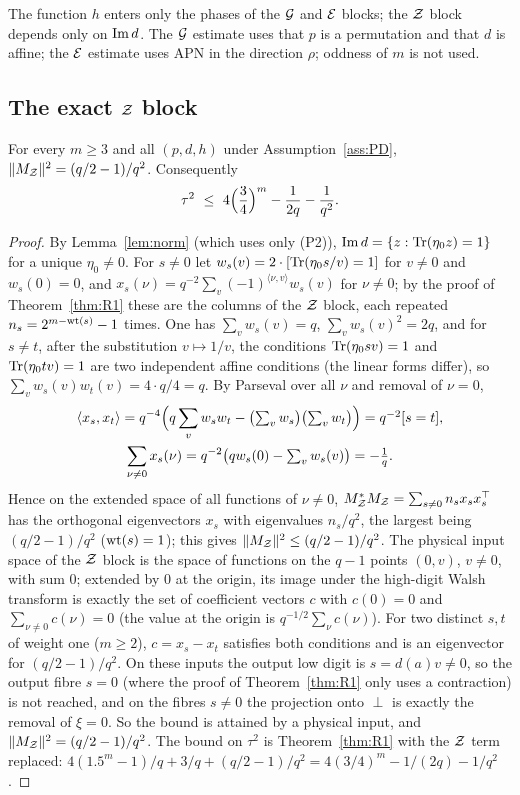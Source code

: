 The function $h$ enters only the phases of the $\mathcal{G}$ and $\mathcal{E}$ blocks; the $\mathcal{Z}$ block depends only on $\mathrm{Im}\, d$.
The $\mathcal{G}$ estimate uses that $p$ is a permutation and that $d$ is affine; the $\mathcal{E}$ estimate uses APN in the direction
$\rho$; oddness of $m$ is not used.


\subsection{The exact $\mathcal{Z}$ block}
\begin{proposition}\label{prop:Zexact}
For every $m\ge3$ and all $(p,d,h)$ under Assumption~\ref{ass:PD}, $\|M_{\mathcal{Z}}\|^2=(q/2-1)/q^2$. Consequently
\[
\tau^2\ \le\ 4\Bigl(\frac34\Bigr)^m-\frac1{2q}-\frac1{q^2}.
\]
\end{proposition}
\begin{proof}
By Lemma~\ref{lem:norm} (which uses only (P2)), $\mathrm{Im}\, d=\{z:\mathrm{Tr}(\eta_0z)=1\}$ for a unique $\eta_0\ne0$. For $s\ne0$ let
$w_s(v)=2\cdot[\mathrm{Tr}(\eta_0s/v)=1]$ for $v\ne0$ and $w_s(0)=0$, and $x_s(\nu)=q^{-2}\sum_v(-1)^{\langle\nu,v\rangle}w_s(v)$ for $\nu\ne0$; by
the proof of Theorem~\ref{thm:R1} these are the columns of the $\mathcal{Z}$ block, each repeated $n_s=2^{m-\mathrm{wt}(s)}-1$ times.
One has $\sum_vw_s(v)=q$, $\sum_vw_s(v)^2=2q$, and for $s\ne t$, after the substitution $v\mapsto1/v$, the conditions
$\mathrm{Tr}(\eta_0sv)=1$ and $\mathrm{Tr}(\eta_0tv)=1$ are two independent affine conditions (the linear forms differ), so
$\sum_vw_s(v)w_t(v)=4\cdot q/4=q$. By Parseval over all $\nu$ and removal of $\nu=0$,
\begin{gather*}
\langle x_s,x_t\rangle=q^{-4}\Bigl(q\sum_vw_sw_t-\bigl(\textstyle\sum_vw_s\bigr)\bigl(\sum_vw_t\bigr)\Bigr)=q^{-2}[s=t],\\
\sum_{\nu\ne0}x_s(\nu)=q^{-2}\bigl(qw_s(0)-\textstyle\sum_vw_s(v)\bigr)=-\frac1q .
\end{gather*}
Hence on the extended space of all functions of $\nu\ne0$, $M_{\mathcal{Z}}^*M_{\mathcal{Z}}=\sum_{s\ne0}n_sx_sx_s^{\top}$ has the orthogonal
eigenvectors $x_s$ with eigenvalues $n_s/q^2$, the largest being $(q/2-1)/q^2$ ($\mathrm{wt}(s)=1$); this gives
$\|M_{\mathcal{Z}}\|^2\le(q/2-1)/q^2$. The physical input space of the $\mathcal{Z}$ block is the space of functions on the $q-1$ points $(0,v)$,
$v\ne0$, with sum $0$; extended by $0$ at the origin, its image under the high-digit Walsh transform is exactly the set of
coefficient vectors $c$ with $c(0)=0$ and $\sum_{\nu\ne0}c(\nu)=0$ (the value at the origin is $q^{-1/2}\sum_\nu c(\nu)$). For two
distinct $s,t$ of weight one ($m\ge2$), $c=x_s-x_t$ satisfies both conditions and is an eigenvector for $(q/2-1)/q^2$. On these
inputs the output low digit is $s=d(a)v\ne0$, so the output fibre $s=0$ (where the proof of Theorem~\ref{thm:R1} only uses a contraction) is not
reached, and on the fibres $s\ne0$ the projection onto $\perp$ is exactly the removal of $\xi=0$. So the bound is attained by
a physical input, and $\|M_{\mathcal{Z}}\|^2=(q/2-1)/q^2$. The bound on $\tau^2$ is Theorem~\ref{thm:R1} with the $\mathcal{Z}$ term replaced:
$4(1.5^m-1)/q+3/q+(q/2-1)/q^2=4(3/4)^m-1/(2q)-1/q^2$.
\end{proof}

